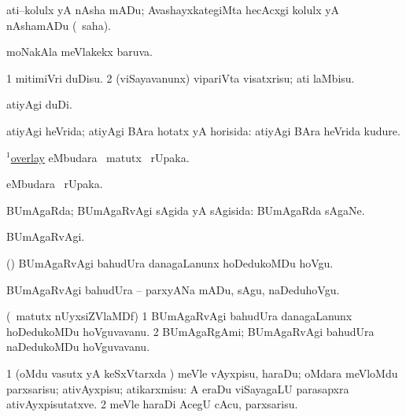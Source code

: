 \bentry
{}
\gl{\sakirx}
\bmng
ati--kolulx yA nAsha mADu; AvashayxkategiMta hecAcxgi kolulx yA nAshamADu (\akirx\ saha). 
\emng
\eentry


\bentry
{}
\gl{\gu}
\bmng
moNakAla meVlakekx baruva. 
\emng
\eentry

\bentry
{}
\gl{\sakirx}
\bmng
\bnum
\num{1} mitimiVri duDisu. 
\num{2} (viSayavanunx) vipariVta visatxrisu; ati laMbisu. 
\enum
\emng

\noindent
\gl{\akirx}
\bmng
atiyAgi duDi. 
\emng
\eentry

\bentry
{}
\gl{\gu}
\bmng
atiyAgi heVrida; atiyAgi BAra hotatx yA horisida:  atiyAgi BAra heVrida kudure. 
\emng
\eentry

\bentry
{}
\gl{\kirx}
\bmng
\hyperlink{overlay(1)}{$^1$overlay} eMbudara \BU\ matutx \BUkaq\ rUpaka. 
\emng
\eentry

\bentry
{}
\gl{\kirx}
\bmng
{} eMbudara \BUkaq\ rUpaka. 
\emng
\eentry

\bentry
{}
\gl{\gu}
\bmng
BUmAgaRda; BUmAgaRvAgi sAgida yA sAgisida:  BUmAgaRda sAgaNe. 
\emng
\eentry

\bentry
{}
\gl{\kirxvi}
\bmng
BUmAgaRvAgi. 
\emng
\eentry

\bentry
{}
\gl{\sakirx}
\bmng
(\AseTxrXV) BUmAgaRvAgi bahudUra danagaLanunx hoDedukoMDu hoVgu. 
\emng

\noindent
\gl{\akirx}
\bmng
BUmAgaRvAgi bahudUra -- parxyANa mADu, sAgu, naDeduhoVgu. 
\emng
\eentry

\bentry
{}
\gl{\nA}
\bmng
(\AseTxrXV\ matutx nUyxsiZVlaMDf) 
\bnum
\num{1} BUmAgaRvAgi bahudUra danagaLanunx hoDedukoMDu hoVguvavanu. 
\num{2} BUmAgaRgAmi; BUmAgaRvAgi bahudUra naDedukoMDu hoVguvavanu. 
\enum
\emng
\eentry

\bentry
{}
\gl{\sakirx}
\bmng
\bnum
\num{1} (oMdu vasutx yA keSxVtarxda \vi) meVle vAyxpisu, haraDu; oMdara meVloMdu parxsarisu; ativAyxpisu; atikarxmisu:  A eraDu viSayagaLU parasapxra ativAyxpisutatxve. 
\num{2} meVle haraDi AcegU cAcu, parxsarisu. 
\enum
\emng

